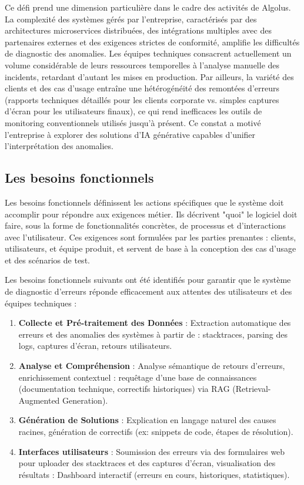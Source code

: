 \documentclass[12pt,a4paper]{report}
\begin{document}
	Ce défi prend une dimension particulière dans le cadre des activités de Algolus. La complexité des systèmes gérés par l'entreprise, caractérisés par des architectures microservices distribuées, des intégrations multiples avec des partenaires externes et des exigences strictes de conformité, amplifie les difficultés de diagnostic des anomalies. Les équipes techniques consacrent actuellement un volume considérable de leurs ressources temporelles à l'analyse manuelle des incidents, retardant d'autant les mises en production. Par ailleurs, la variété des clients et des cas d'usage entraîne une hétérogénéité des remontées d'erreurs (rapports techniques détaillés pour les clients corporate vs. simples captures d'écran pour les utilisateurs finaux), ce qui rend inefficaces les outils de monitoring conventionnels utilisés jusqu'à présent. Ce constat a motivé l'entreprise à explorer des solutions d'IA générative capables d'unifier l'interprétation des anomalies.
	
	\subsection{Les besoins fonctionnels}
	
	Les besoins fonctionnels définissent les actions spécifiques que le système doit accomplir pour répondre aux exigences métier. Ils décrivent "quoi" le logiciel doit faire, sous la forme de fonctionnalités concrètes, de processus et d'interactions avec l'utilisateur. Ces exigences sont formulées par les parties prenantes : clients, utilisateurs, et équipe produit,  et servent de base à la conception des cas d’usage et des scénarios de test.
	
	Les besoins fonctionnels suivants ont été identifiés pour garantir que le système de diagnostic d’erreurs réponde efficacement aux attentes des utilisateurs et des équipes techniques :
	
	\begin{enumerate}
		
		\item \textbf{Collecte et Pré-traitement des Données} : Extraction automatique des erreurs et des anomalies des systèmes à partir de :
		stacktraces, parsing des logs, captures d’écran, retours utilisateurs.
		
		\item \textbf{Analyse et Compréhension} : Analyse sémantique de retours d’erreurs, enrichissement contextuel : requêtage d’une base de connaissances (documentation technique, correctifs historiques) via RAG (Retrieval-Augmented Generation).
		
		\item \textbf{Génération de Solutions} : Explication en langage naturel des causes racines, génération de correctifs (ex: snippets de code, étapes de résolution).
		
		\item \textbf{Interfaces utilisateurs} : Soumission des erreurs via des formulaires web pour uploader des stacktraces et des captures d'écran, visualisation des résultats : Dashboard interactif (erreurs en cours, historiques, statistiques).

	\end{enumerate}
	
\end{document}
